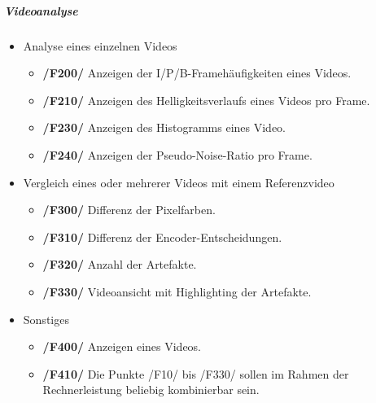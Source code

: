 \subparagraph{Videoanalyse}
\begin{itemize}
	\item Analyse eines einzelnen Videos  
		\begin{itemize}
			\item \textbf{/F200/} Anzeigen der I/P/B-Framehäufigkeiten eines Videos.
			\item \textbf{/F210/} Anzeigen des Helligkeitsverlaufs eines Videos pro Frame.
			\item \textbf{/F230/} Anzeigen des Histogramms eines Video.
			\item \textbf{/F240/} Anzeigen der Pseudo-Noise-Ratio pro Frame.
		   \end{itemize} 
	\item Vergleich eines oder mehrerer Videos mit einem Referenzvideo
		\begin{itemize}
			\item \textbf{/F300/} Differenz der Pixelfarben.
			\item \textbf{/F310/} Differenz der Encoder-Entscheidungen.
			\item \textbf{/F320/} Anzahl der Artefakte.
			\item \textbf{/F330/} Videoansicht mit Highlighting der Artefakte.
		\end{itemize}	
	\item Sonstiges
		\begin{itemize}
			\item \textbf{/F400/} Anzeigen eines Videos. 
			\item \textbf{/F410/} Die Punkte /F10/ bis /F330/ sollen im Rahmen der Rechnerleistung beliebig kombinierbar sein.
		\end{itemize}
\end{itemize}

